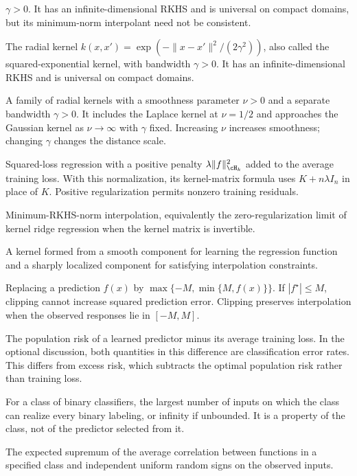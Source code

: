 \documentclass[11pt,twoside]{article}
\theoremstyle{definition}
\theoremstyle{remark}
\begin{document}
\begin{description}[style=nextline,leftmargin=1.5em,labelindent=0pt]
$\gamma>0$. It has an infinite-dimensional RKHS and is universal on
compact domains, but its minimum-norm interpolant need not be consistent.
\item[Gaussian kernel]
The radial kernel $k(x,x')=\exp(-\|x-x'\|^2/(2\gamma^2))$, also called
the squared-exponential kernel, with bandwidth $\gamma>0$. It has an
infinite-dimensional RKHS and is universal on compact domains.
\item[Mat\'ern family]
A family of radial kernels with a smoothness parameter $\nu>0$ and a
separate bandwidth $\gamma>0$. It includes the Laplace kernel at
$\nu=1/2$ and approaches the Gaussian kernel as $\nu\to\infty$ with
$\gamma$ fixed. Increasing $\nu$ increases smoothness; changing
$\gamma$ changes the distance scale.
\item[Kernel ridge regression]
Squared-loss regression with a positive penalty
$\lambda\|f\|_{\cH_k}^2$ added to the average training loss.
With this normalization, its kernel-matrix formula uses
$K+n\lambda I_n$ in place of $K$. Positive regularization permits
nonzero training residuals.
\item[Ridgeless kernel regression]
Minimum-RKHS-norm interpolation, equivalently the zero-regularization limit
of kernel ridge regression when the kernel matrix is invertible.
\item[Spiky-smooth kernel]
A kernel formed from a smooth component for learning the regression function
and a sharply localized component for satisfying interpolation constraints.
\item[Clipping]
Replacing a prediction $f(x)$ by $\max\{-M,\min\{M,f(x)\}\}$.
If $|f^\star|\le M$, clipping cannot increase squared prediction error.
Clipping preserves interpolation when the observed responses lie in $[-M,M]$.
\item[Generalization gap]
The population risk of a learned predictor minus its average training
loss. In the optional discussion, both quantities in this difference are
classification error rates.
This differs from excess risk, which subtracts the optimal population
risk rather than training loss.
\item[VC dimension]
For a class of binary classifiers, the largest number of inputs on which
the class can realize every binary labeling, or infinity if unbounded.
It is a property of the class, not of the predictor selected from it.
\item[Empirical Rademacher complexity]
The expected supremum of the average correlation between functions in a specified
class and independent uniform random signs on the observed inputs.

\end{description}
\end{document}
